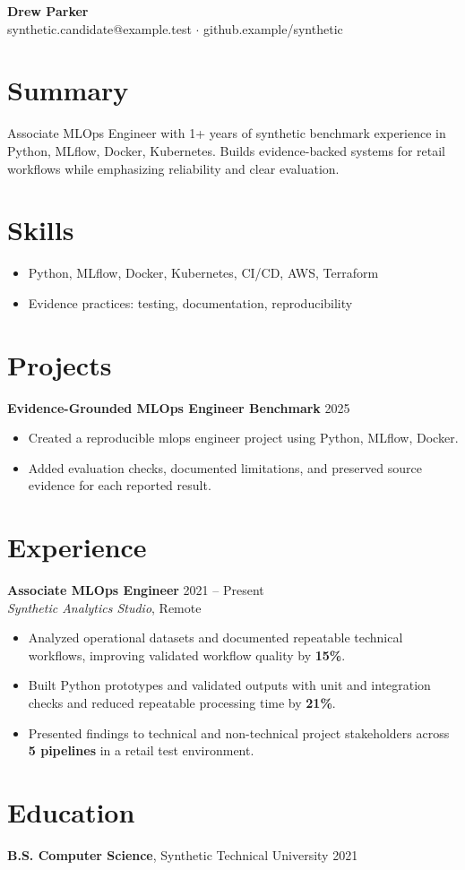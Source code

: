 \documentclass[10pt,letterpaper]{article}
\begin{document}
\begin{center}
{\Large \textbf{Drew Parker}}\\
synthetic.candidate@example.test $\cdot$ github.example/synthetic
\end{center}

\section*{Summary}
Associate MLOps Engineer with 1+ years of synthetic benchmark experience in Python, MLflow, Docker, Kubernetes. Builds evidence-backed systems for retail workflows while emphasizing reliability and clear evaluation.

\section*{Skills}
\begin{itemize}
  \item Python, MLflow, Docker, Kubernetes, CI/CD, AWS, Terraform
  \item Evidence practices: testing, documentation, reproducibility
\end{itemize}

\section*{Projects}
\textbf{Evidence-Grounded MLOps Engineer Benchmark} \hfill 2025
\begin{itemize}
  \item Created a reproducible mlops engineer project using Python, MLflow, Docker.
  \item Added evaluation checks, documented limitations, and preserved source evidence for each reported result.
\end{itemize}

\section*{Experience}
\textbf{Associate MLOps Engineer} \hfill 2021 -- Present\\
\textit{Synthetic Analytics Studio}, Remote
\begin{itemize}
  \item Analyzed operational datasets and documented repeatable technical workflows, improving validated workflow quality by \textbf{15\%}.
  \item Built Python prototypes and validated outputs with unit and integration checks and reduced repeatable processing time by \textbf{21\%}.
  \item Presented findings to technical and non-technical project stakeholders across \textbf{5 pipelines} in a retail test environment.
\end{itemize}

\section*{Education}
\textbf{B.S. Computer Science}, Synthetic Technical University \hfill 2021
\end{document}
